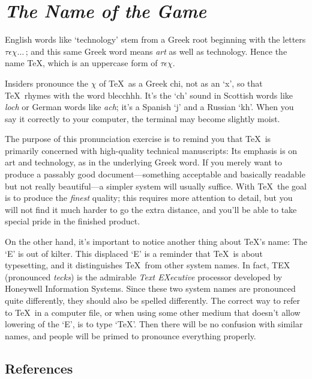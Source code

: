\chapter{\sl The Name of the Game}

English words like `technology' stem from a Greek root beginning with
the letters $\tau\epsilon\chi\ldots\,$; and this same Greek word means {\sl
art\/} as well as technology. Hence the name \TeX, which is an
uppercase form of $\tau\epsilon\chi$.

Insiders pronounce the $\chi$ of \TeX\ as a Greek chi, not as an `x', so that
\TeX\ rhymes with the word blecchhh. It's the `ch' sound in Scottish words
like {\sl loch\/} or German words like {\sl ach\/}; it's a Spanish `j' and a
Russian `kh'. When you say it correctly to your computer, the terminal
may become slightly moist.

The purpose of this pronunciation exercise is to remind you that \TeX\ is
primarily concerned with high-quality technical manuscripts: Its emphasis is
on art and technology, as in the underlying Greek word. If you merely want
to produce a passably good document---something acceptable and basically
readable but not really beautiful---a simpler system will usually suffice.
With \TeX\ the goal is to produce the {\sl finest\/} quality; this requires
more attention to detail, but you will not find it much harder to go the
extra distance, and you'll be able to take special pride in the finished
product. 

On the other hand, it's important to notice another thing about \TeX's name:
The `E' is out of kilter. This 
displaced `E' is a reminder that \TeX\ is about typesetting, and it
distinguishes \TeX\ from other system names. In fact, TEX (pronounced
{\sl tecks\/}) is the admirable {\sl Text EXecutive\/} processor developed by
Honeywell Information Systems. Since these two system names are
pronounced quite differently, they should also be spelled differently. The
correct way to refer to \TeX\ in a computer file, or when using some other
medium that doesn't allow lowering of the `E', is to type `TeX'. Then
there will be no confusion with similar names, and people will be
primed to pronounce everything properly.

\section*{References}

